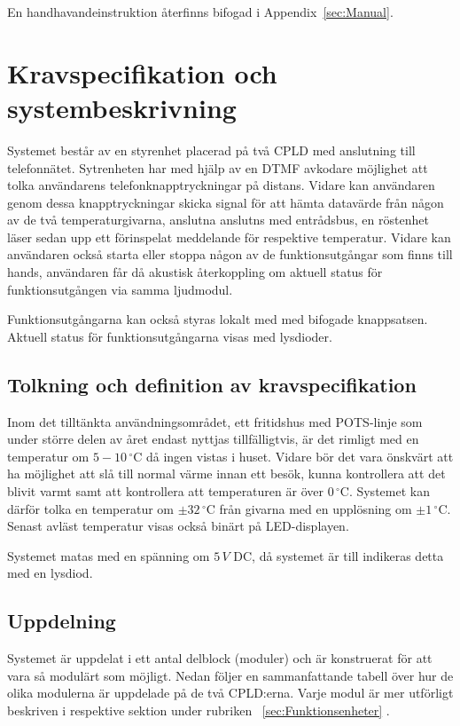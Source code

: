 \documentclass[a4paper,11pt]{article}
\begin{document}
	En handhavandeinstruktion återfinns bifogad i Appendix~\ref{sec:Manual}.

\pagebreak

\section{Kravspecifikation och systembeskrivning}
	Systemet består av en styrenhet placerad på två CPLD med anslutning till telefonnätet. Sytrenheten har med hjälp av en DTMF avkodare möjlighet att tolka användarens telefonknapptryckningar på distans. Vidare kan användaren genom dessa knapptryckningar skicka signal för att hämta datavärde från någon av de två temperaturgivarna, anslutna anslutns med entrådsbus, en röstenhet läser sedan upp ett förinspelat meddelande för respektive temperatur. Vidare kan användaren också starta eller stoppa någon av de funktionsutgångar som finns till hands, användaren får då akustisk återkoppling om aktuell status för funktionsutgången via samma ljudmodul.

Funktionsutgångarna kan också styras lokalt med med bifogade knappsatsen. Aktuell status för funktionsutgångarna visas med lysdioder. 

	\subsection{Tolkning och definition av kravspecifikation}

		Inom det tilltänkta användningsområdet, ett fritidshus med POTS-linje som under större delen av året endast nyttjas tillfälligtvis, är det rimligt med en temperatur om $5-10\,^{\circ}\mathrm{C}$ då ingen vistas i huset. Vidare bör det vara önskvärt att ha möjlighet att slå till normal värme innan ett besök, kunna kontrollera att det blivit varmt samt att kontrollera att temperaturen är över $0\,^{\circ}\mathrm{C}$. Systemet kan därför tolka en temperatur om $\pm 32\,^{\circ}\mathrm{C}$ från givarna med en upplösning om $\pm 1\,^{\circ}\mathrm{C}$. Senast avläst temperatur visas också binärt på LED-displayen.

		Systemet matas med en spänning om $5\,V$ DC, då systemet är till indikeras detta med en lysdiod.

	\subsection{Uppdelning}

	Systemet är uppdelat i ett antal delblock (moduler) och är konstruerat för att vara så modulärt som möjligt.
	Nedan följer en sammanfattande tabell över hur de olika modulerna är uppdelade på de två CPLD:erna. Varje modul är mer
	utförligt beskriven i respektive sektion under rubriken ~\ref{sec:Funktionsenheter} . 
\end{document}
